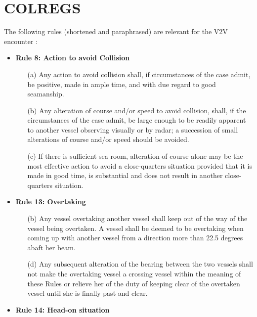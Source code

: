 

\section{COLREGS}\label{sec:colregs}

The following rules (shortened and paraphrased) are relevant for the V2V encounter \citep{COLREGS}:

\begin{itemize}
    \item \textbf{Rule 8: Action to avoid Collision}
        \begin{enumerate}
            \item[(a)] Any action to avoid collision shall, if circumstances of the case admit, be positive, made in ample time, and with due regard to good seamanship.
            \item[(b)] Any alteration of course and/or speed to avoid collision, shall, if the circumstances of the case admit, be large enough to be readily apparent to another vessel observing visually or by radar; a succession of small alterations of course and/or speed should be avoided.
            \item[(c)] If there is sufficient sea room, alteration of course alone may be the most effective action to avoid
            a close-quarters situation provided that it is made in good time, is substantial and does not result in
            another close-quarters situation.
        \end{enumerate}
    \item \textbf{Rule 13: Overtaking }
        \begin{enumerate}
            \item[(b)] Any vessel overtaking another vessel shall keep out of the way of the vessel being overtaken. A vessel shall be deemed to be overtaking when coming up with another vessel from a direction more than 22.5 degrees abaft her beam.
            \item[(d)] Any subsequent alteration of the bearing between the two vessels shall not make the overtaking vessel a crossing vessel within the meaning of these Rules or relieve her of the duty of keeping clear of the overtaken vessel until she is finally past and clear.
        \end{enumerate}
    \item \textbf{Rule 14: Head-on situation}
        \begin{enumerate}

\end{enumerate}
\end{itemize}
